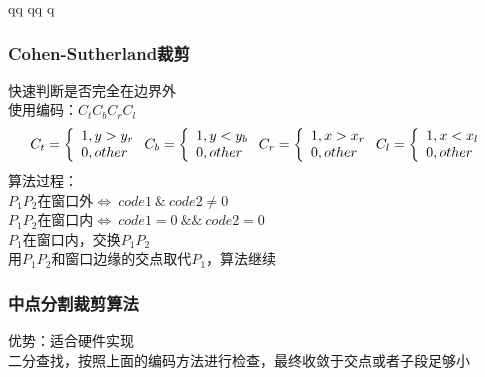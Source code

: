 qq	qq	q                                                                                                                                                                                                                                                                                      \documentclass{article}
\begin{document}
\begin{CJK}{UTF8}{gbsn}
\subsubsection{Cohen-Sutherland裁剪}
快速判断是否完全在边界外\\
使用编码：$C_tC_bC_rC_l$\\
\begin{equation}
C_t=\left\lbrace 
\begin{array}{l}
1,y>y_r\\
0,other\\
\end{array}
\right.\\
C_b=\left\lbrace 
\begin{array}{l}
1,y<y_b\\
0,other\\
\end{array}
\right.\\
C_r=\left\lbrace 
\begin{array}{l}
1,x>x_r\\
0,other\\
\end{array}
\right.\\
C_l=\left\lbrace 
\begin{array}{l}
1,x<x_l\\
0,other\\
\end{array}
\right.\\	
\end{equation}
算法过程：\\
$P_1P_2$在窗口外$\Leftrightarrow\ code1\ \&\ code2 \neq 0$\\
$P_1P_2$在窗口内$\Leftrightarrow\ code1=0\ \&\&\ code2= 0$\\
$P_1$在窗口内，交换$P_1P_2$\\
用$P_1P_2$和窗口边缘的交点取代$P_1$，算法继续\\

	\subsubsection{中点分割裁剪算法}
	优势：适合硬件实现\\
	二分查找，按照上面的编码方法进行检查，最终收敛于交点或者子段足够小\\

\end{CJK}
\end{document}
